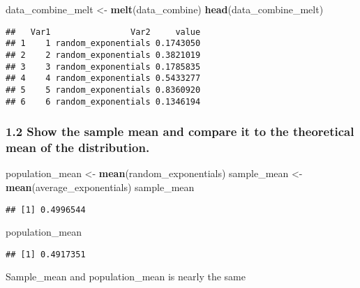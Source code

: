 \documentclass[]{article}
\newenvironment{Shaded}{\begin{snugshade}}{\end{snugshade}}
\newcommand{\KeywordTok}[1]{\textcolor[rgb]{0.13,0.29,0.53}{\textbf{#1}}}
\newcommand{\DataTypeTok}[1]{\textcolor[rgb]{0.13,0.29,0.53}{#1}}
\newcommand{\StringTok}[1]{\textcolor[rgb]{0.31,0.60,0.02}{#1}}
\newcommand{\OperatorTok}[1]{\textcolor[rgb]{0.81,0.36,0.00}{\textbf{#1}}}
\newcommand{\NormalTok}[1]{#1}
\begin{document}
\begin{Shaded}
\begin{Highlighting}[]
\NormalTok{data_combine_melt <-}\StringTok{ }\KeywordTok{melt}\NormalTok{(data_combine)}
\KeywordTok{head}\NormalTok{(data_combine_melt)}
\end{Highlighting}
\end{Shaded}

\begin{verbatim}
##   Var1                Var2     value
## 1    1 random_exponentials 0.1743050
## 2    2 random_exponentials 0.3821019
## 3    3 random_exponentials 0.1785835
## 4    4 random_exponentials 0.5433277
## 5    5 random_exponentials 0.8360920
## 6    6 random_exponentials 0.1346194
\end{verbatim}

\subsubsection{1.2 Show the sample mean and compare it to the
theoretical mean of the
distribution.}\label{show-the-sample-mean-and-compare-it-to-the-theoretical-mean-of-the-distribution.}

\begin{Shaded}
\begin{Highlighting}[]
\NormalTok{population_mean <-}\StringTok{ }\KeywordTok{mean}\NormalTok{(random_exponentials)}
\NormalTok{sample_mean <-}\StringTok{ }\KeywordTok{mean}\NormalTok{(average_exponentials)}
\NormalTok{sample_mean}
\end{Highlighting}
\end{Shaded}

\begin{verbatim}
## [1] 0.4996544
\end{verbatim}

\begin{Shaded}
\begin{Highlighting}[]
\NormalTok{population_mean}
\end{Highlighting}
\end{Shaded}

\begin{verbatim}
## [1] 0.4917351
\end{verbatim}

Sample\_mean and population\_mean is nearly the same

\begin{Shaded}
\end{Shaded}
\end{document}
